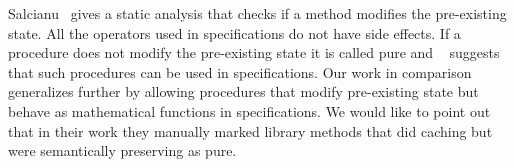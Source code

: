 \documentclass{llncs}
\begin{document}
Salcianu~\cite{sualcianu2005purity} gives a static analysis that
checks if a method modifies the pre-existing state. All the operators
used in specifications do not have side effects. If a procedure does
not modify the pre-existing state it is called pure and
~\cite{barnett200499} suggests that such procedures can be used in
specifications. Our work in comparison generalizes further by allowing
procedures that modify pre-existing state but behave as mathematical
functions in specifications. We would like to point out that in their
work they manually marked library methods that did caching but were
semantically preserving as pure.

\nocite{barnett2004spec}
\nocite{lahiri2013differential}
\nocite{de2008z3}
\nocite{alpern1988detecting}
\nocite{sondergaard1990referential}
\nocite{flanagan2001avoiding}
\nocite{sualcianu2005purity}
\nocite{cytron1991efficiently}
\nocite{leino2008boogie}


\begin{subappendices}
\renewcommand{\thesection}{\Alph{section}}



\end{subappendices}

%

%
%





\end{document}
